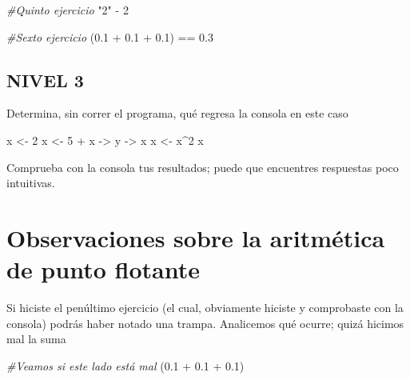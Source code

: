 \documentclass[
]{book}
\newenvironment{Shaded}{\begin{snugshade}}{\end{snugshade}}
\newcommand{\CommentTok}[1]{\textcolor[rgb]{0.56,0.35,0.01}{\textit{#1}}}
\newcommand{\DecValTok}[1]{\textcolor[rgb]{0.00,0.00,0.81}{#1}}
\newcommand{\FloatTok}[1]{\textcolor[rgb]{0.00,0.00,0.81}{#1}}
\newcommand{\NormalTok}[1]{#1}
\newcommand{\OtherTok}[1]{\textcolor[rgb]{0.56,0.35,0.01}{#1}}
\newcommand{\SpecialCharTok}[1]{\textcolor[rgb]{0.00,0.00,0.00}{#1}}
\newcommand{\StringTok}[1]{\textcolor[rgb]{0.31,0.60,0.02}{#1}}
\begin{document}
\begin{Shaded}
\begin{Highlighting}[]
\CommentTok{\#Quinto ejercicio}
\StringTok{"2"} \SpecialCharTok{{-}} \DecValTok{2}
\end{Highlighting}
\end{Shaded}

\begin{Shaded}
\begin{Highlighting}[]
\CommentTok{\#Sexto ejercicio}
\NormalTok{(}\FloatTok{0.1} \SpecialCharTok{+} \FloatTok{0.1} \SpecialCharTok{+} \FloatTok{0.1}\NormalTok{) }\SpecialCharTok{==} \FloatTok{0.3}
\end{Highlighting}
\end{Shaded}

\hypertarget{nivel-3}{%
\subsection{NIVEL 3}\label{nivel-3}}

Determina, sin correr el programa, qué regresa la consola en este caso

\begin{Shaded}
\begin{Highlighting}[]
\NormalTok{x }\OtherTok{\textless{}{-}} \DecValTok{2} 
\NormalTok{x }\OtherTok{\textless{}{-}} \DecValTok{5} \SpecialCharTok{+}\NormalTok{ x }\OtherTok{{-}\textgreater{}}\NormalTok{ y }\OtherTok{{-}\textgreater{}}\NormalTok{ x}
\NormalTok{x }\OtherTok{\textless{}{-}}\NormalTok{ x}\SpecialCharTok{\^{}}\DecValTok{2}
\NormalTok{x}
\end{Highlighting}
\end{Shaded}

Comprueba con la consola tus resultados; puede que encuentres respuestas poco intuitivas.

\hypertarget{observaciones-sobre-la-aritmuxe9tica-de-punto-flotante}{%
\section{Observaciones sobre la aritmética de punto flotante}\label{observaciones-sobre-la-aritmuxe9tica-de-punto-flotante}}

Si hiciste el penúltimo ejercicio (el cual, obviamente hiciste y comprobaste con la consola) podrás haber notado una trampa. Analicemos qué ocurre; quizá hicimos mal la suma

\begin{Shaded}
\begin{Highlighting}[]
\CommentTok{\#Veamos si este lado está mal}
\NormalTok{(}\FloatTok{0.1} \SpecialCharTok{+} \FloatTok{0.1} \SpecialCharTok{+} \FloatTok{0.1}\NormalTok{)}
\end{Highlighting}
\end{Shaded}
\end{document}
